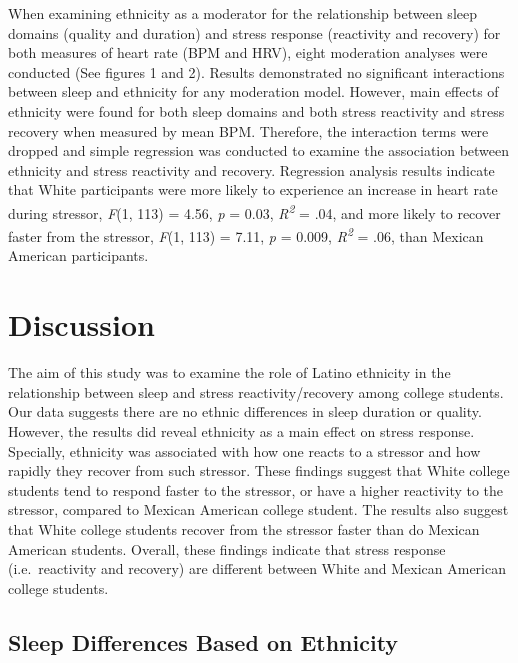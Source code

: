 \documentclass[man, fleqn, noextraspace]{apa6}
\begin{document}
When examining ethnicity as a moderator for the relationship between sleep domains (quality and duration) and stress response (reactivity and recovery) for both measures of heart rate (BPM and HRV), eight moderation analyses were conducted (See figures 1 and 2). Results demonstrated no significant interactions between sleep and ethnicity for any moderation model. However, main effects of ethnicity were found for both sleep domains and both stress reactivity and stress recovery when measured by mean BPM. Therefore, the interaction terms were dropped and simple regression was conducted to examine the association between ethnicity and stress reactivity and recovery. Regression analysis results indicate that White participants were more likely to experience an increase in heart rate during stressor, \emph{F}(1, 113) = 4.56, \emph{p} = 0.03, \emph{R\textsuperscript{2}} = .04, and more likely to recover faster from the stressor, \emph{F}(1, 113) = 7.11, \emph{p} = 0.009, \emph{R\textsuperscript{2}} = .06, than Mexican American participants.

\hypertarget{discussion}{%
\section{Discussion}\label{discussion}}

The aim of this study was to examine the role of Latino ethnicity in the relationship between sleep and stress reactivity/recovery among college students. Our data suggests there are no ethnic differences in sleep duration or quality. However, the results did reveal ethnicity as a main effect on stress response. Specially, ethnicity was associated with how one reacts to a stressor and how rapidly they recover from such stressor. These findings suggest that White college students tend to respond faster to the stressor, or have a higher reactivity to the stressor, compared to Mexican American college student. The results also suggest that White college students recover from the stressor faster than do Mexican American students. Overall, these findings indicate that stress response (i.e.~reactivity and recovery) are different between White and Mexican American college students.

\hypertarget{sleep-differences-based-on-ethnicity}{%
\subsection{Sleep Differences Based on Ethnicity}\label{sleep-differences-based-on-ethnicity}}
\end{document}
